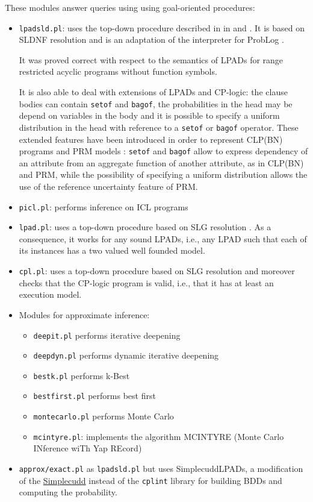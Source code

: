 \documentclass[a4paper,10pt]{scrartcl}
\begin{document}
These modules answer queries using using goal-oriented procedures:
\begin{itemize}
\item \texttt{lpadsld.pl}: uses the top-down procedure described in 
in \cite{Rig-AIIA07-IC} and \cite{Rig-RCRA07-IC}. It is based on SLDNF resolution and is an adaptation of the interpreter for ProbLog \cite{DBLP:conf/ijcai/RaedtKT07}.

It was proved correct \cite{Rig-RCRA07-IC} with respect to the semantics of LPADs for range restricted acyclic programs \cite{DBLP:journals/ngc/AptB91} without function symbols.

It is also able to deal with extensions of LPADs and CP-logic: the clause bodies can contain \texttt{setof} and \texttt{bagof}, the probabilities in the head may be depend on variables in the body and it is possible to specify a uniform distribution in the head with reference to a \texttt{setof} or \texttt{bagof} operator. These extended features have been introduced in order to represent CLP(BN) \cite{SanPagQaz03-UAI-IC} programs and PRM models \cite{Getoor+al:JMLR02}:
\texttt{setof} and \texttt{bagof} allow to express dependency of an attribute from an aggregate function of another attribute, as in CLP(BN)  and PRM, while the possibility of specifying a uniform distribution allows the use of the reference uncertainty feature of PRM.
\item \texttt{picl.pl}: performs inference on ICL programs \cite{Rig09-LJIGPL-IJ}
\item \texttt{lpad.pl}: uses  a top-down procedure based on SLG resolution \cite{DBLP:journals/jacm/ChenW96}. As a consequence, it works for any sound LPADs, i.e., any LPAD such that each of its instances has a two valued well founded model. 
\item \texttt{cpl.pl}: uses a top-down procedure based on SLG resolution and moreover checks that the CP-logic program is valid, i.e., that it has at least an execution model.
\item Modules for approximate inference:
\begin{itemize}
\item \texttt{deepit.pl} performs iterative deepening \cite{BraRig10-ILP10-IC}
\item \texttt{deepdyn.pl} performs  dynamic iterative deepening \cite{BraRig10-ILP10-IC}
\item \texttt{bestk.pl} performs  k-Best \cite{BraRig10-ILP10-IC}
\item \texttt{bestfirst.pl} performs  best first \cite{BraRig10-ILP10-IC}
\item \texttt{montecarlo.pl} performs  Monte Carlo \cite{BraRig10-ILP10-IC}
\item \texttt{mcintyre.pl}: implements the algorithm MCINTYRE (Monte Carlo INference wiTh Yap REcord) \cite{Rig11-CILC11-NC}
\end{itemize}
\item \texttt{approx/exact.pl} as \texttt{lpadsld.pl} but uses  SimplecuddLPADs, a modification of the \href{http://dtai.cs.kuleuven.be/problog/download.html}{Simplecudd} instead of the \texttt{cplint} library for building BDDs and computing the probability.
\end{itemize}
\end{document}
